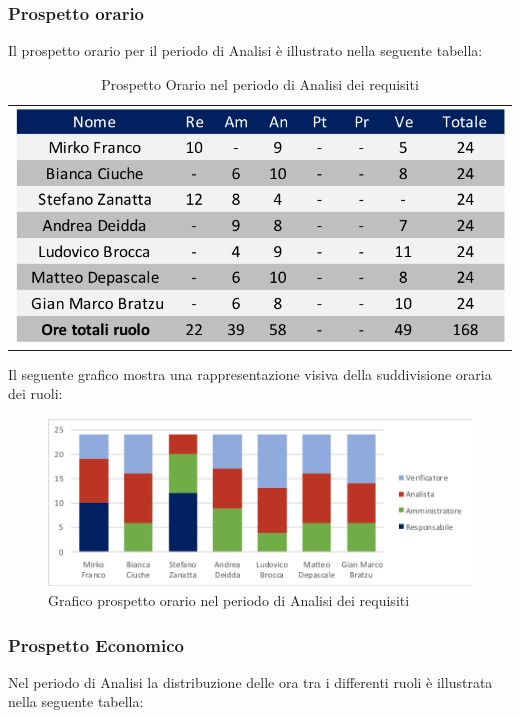 \subsubsection{Prospetto orario}
Il prospetto orario per il periodo di Analisi è illustrato nella seguente tabella:

\begin{table}[!ht]
  \begin{center}  	
	\begin{tabular}{c}
		\includegraphics[scale=0.90]{images/tabellaProspettoOrario.png}
		\end{tabular}
		\caption{Prospetto Orario nel periodo di Analisi dei requisiti}
	\end{center}
	\end{table}
Il seguente grafico mostra una rappresentazione visiva della suddivisione oraria dei ruoli:
\begin{figure}[!ht]
	\begin{center}
	\includegraphics{images/grafoProspettoOrario.png}
	\caption{Grafico prospetto orario nel periodo di Analisi dei requisiti }
	\end{center}
\end{figure}

\newpage
\subsubsection{Prospetto Economico}
Nel periodo di Analisi la distribuzione delle ora tra i differenti ruoli è illustrata nella seguente tabella:

